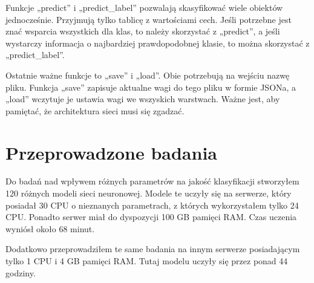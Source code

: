     Funkcje „predict” i „predict\_label” pozwalają skasyfikować wiele obiektów jednocześnie.
    Przyjmują tylko tablicę z wartościami cech.
    Jeśli potrzebne jest znać wsparcia wszystkich dla klas, to należy skorzystać z „predict”, a jeśli wystarczy informacja o najbardziej prawdopodobnej klasie, to można skorzystać z „predict\_label”.

    Ostatnie ważne funkcje to „save” i „load”.
    Obie potrzebują na wejściu nazwę pliku.
    Funkcja „save” zapisuje aktualne wagi do tego pliku w formie JSONa, a „load” wczytuje je ustawia wagi we wszyskich warstwach.
    Ważne jest, aby pamiętać, że architektura sieci musi się zgadzać.

    \chapter{Przeprowadzone badania}\label{ch:przeprowadzoneBadania}

    Do badań nad wpływem różnych parametrów na jakość klasyfikacji stworzyłem 120 różnych modeli sieci neuronowej.
    Modele te uczyły się na serwerze, który posiadał 30 CPU o nieznanych parametrach, z których wykorzystałem tylko 24 CPU.
    Ponadto serwer miał do dyspozycji 100 GB pamięci RAM.
    Czas uczenia wyniósł około 68 minut.

    Dodatkowo przeprowadziłem te same badania na innym serwerze posiadającym tylko 1 CPU i 4 GB pamięci RAM.
    Tutaj modelu uczyły się przez ponad 44 godziny.


